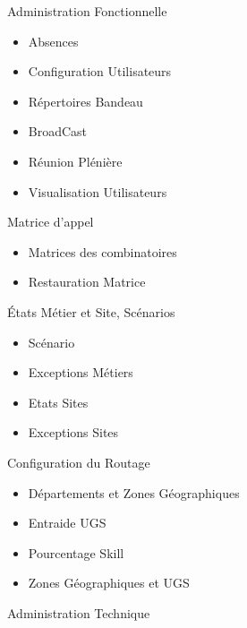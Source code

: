 \documentclass{rapport}
\begin{document}
\vspace{5mm} %
\begin{itemize}

\begin{minipage}{0.5\textwidth}
\item Administration Fonctionnelle
        \begin{itemize}
        \item Absences
        \item Configuration Utilisateurs
        \item Répertoires Bandeau
        \item BroadCast
        \item Réunion Plénière
        \item Visualisation Utilisateurs
        \end{itemize}
    \vspace{5mm} %
    \item Matrice d'appel
        \begin{itemize}
        \item Matrices des combinatoires
        \item Restauration Matrice
        \end{itemize}
    \vspace{5mm} %
    \item États Métier et Site, Scénarios
        \begin{itemize}
        \item Scénario
        \item Exceptions Métiers
        \item Etats Sites
        \item Exceptions Sites
        \end{itemize}
\end{minipage}
\begin{minipage}{0.5\textwidth}
    \item Configuration du Routage
        \begin{itemize}
        \item Départements et Zones Géographiques
        \item Entraide UGS
        \item Pourcentage Skill
        \item Zones Géographiques et UGS
        \end{itemize}
    \vspace{5mm} %
    \item Administration Technique

\end{minipage}
\end{itemize}
\end{document}
